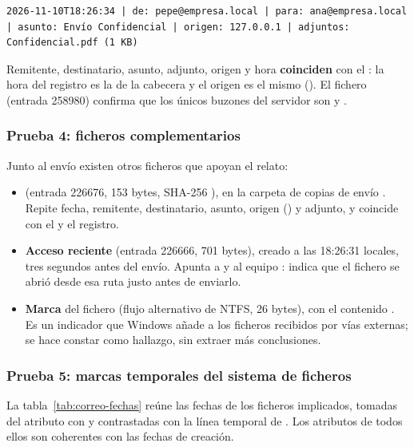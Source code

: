 \begin{itemize}
\begin{lstlisting}[style=terminal,basicstyle=\ttfamily\footnotesize,breaklines=true]
2026-11-10T18:26:34 | de: pepe@empresa.local | para: ana@empresa.local | asunto: Envío Confidencial | origen: 127.0.0.1 | adjuntos: Confidencial.pdf (1 KB)
\end{lstlisting}

Remitente, destinatario, asunto, adjunto, origen y hora \textbf{coinciden} con
el : la hora del registro es la de la cabecera  y el origen
es el mismo (). El fichero  (entrada 258980)
confirma que los únicos buzones del servidor son  y .

\subsubsection{Prueba 4: ficheros complementarios}
Junto al envío existen otros ficheros que apoyan el relato:

\begin{itemize}
  \item \textbf{} (entrada 226676, 153 bytes, SHA-256
        ), en la carpeta de copias de envío
        . Repite fecha,
        remitente, destinatario, asunto, origen () y adjunto,
        y coincide con el  y el registro.
  \item \textbf{Acceso reciente}  (entrada
        226666, 701 bytes), creado a las 18:26:31 locales, tres segundos antes
        del envío. Apunta a  y al equipo
        : indica que el fichero se abrió desde esa ruta
        justo antes de enviarlo.
  \item \textbf{Marca } del fichero
         (flujo alternativo de NTFS,
        26 bytes), con el contenido . Es un
        indicador que Windows añade a los ficheros recibidos por vías
        externas; se hace constar como hallazgo, sin extraer más conclusiones.
\end{itemize}

\subsubsection{Prueba 5: marcas temporales del sistema de ficheros}
La tabla~\ref{tab:correo-fechas} reúne las fechas de los ficheros implicados,
tomadas del atributo  con  y
contrastadas con la línea temporal de . Los atributos
 de todos ellos son coherentes con las fechas de creación.


\end{itemize}
